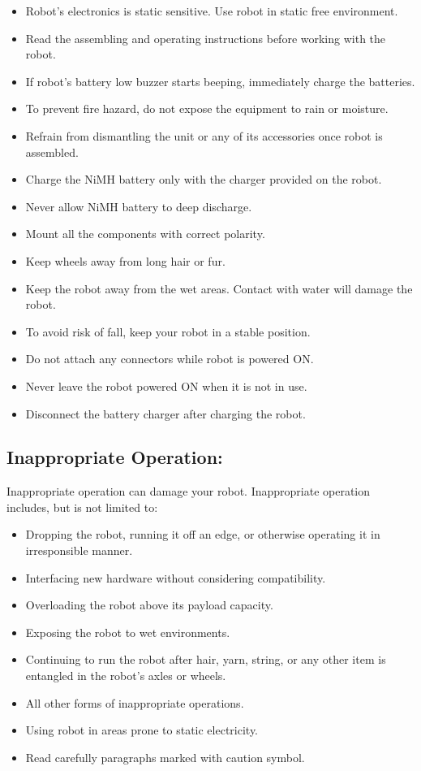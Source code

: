 \documentclass[a4paper,10pt,oneside]{article}
\begin{document}
{\begin{itemize}
	\item  Robot’s electronics is static sensitive. Use robot in static free environment.
	\item Read the assembling and operating instructions before working with the robot.
	\item If robot’s battery low buzzer starts beeping, immediately charge the batteries.
	\item To prevent fire hazard, do not expose the equipment to rain or moisture.
	\item Refrain from dismantling the unit or any of its accessories once robot is assembled.
	\item Charge the NiMH battery only with the charger provided on the robot.
	\item Never allow NiMH battery to deep discharge.
	\item Mount all the components with correct polarity.
	\item Keep wheels away from long hair or fur.
	\item Keep the robot away from the wet areas. Contact with water will damage the robot.
	\item To avoid risk of fall, keep your robot in a stable position.
	\item Do not attach any connectors while robot is powered ON.
	\item Never leave the robot powered ON when it is not in use.
	\item Disconnect the battery charger after charging the robot. 
\end{itemize}
	\subsection{\textbf{Inappropriate Operation:}}
	Inappropriate operation can damage your robot. Inappropriate operation includes, but is not
	limited to:
	\begin{itemize}
	\item Dropping the robot, running it off an edge, or otherwise operating it in irresponsible
	manner.
	\item Interfacing new hardware without considering compatibility.
	\item Overloading the robot above its payload capacity.
	\item Exposing the robot to wet environments.
	\item Continuing to run the robot after hair, yarn, string, or any other item is entangled in the
	robot’s axles or wheels.
	\item All other forms of inappropriate operations.
	\item Using robot in areas prone to static electricity.
	\item Read carefully paragraphs marked with caution symbol.
	\end{itemize}
}
\end{document}
